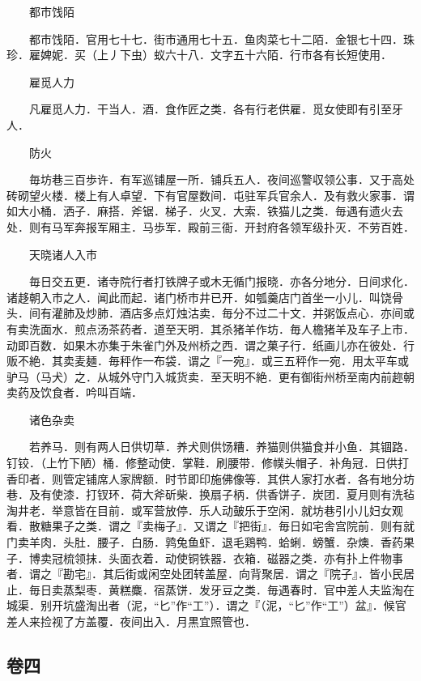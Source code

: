 　　都市饯陌

　　都市饯陌．官用七十七．街市通用七十五．鱼肉菜七十二陌．金银七十四．珠珍．雇婢妮．买（上丿下虫）蚁六十八．文字五十六陌．行市各有长短使用．

　　雇觅人力

　　凡雇觅人力．干当人．酒．食作匠之类．各有行老供雇．觅女使即有引至牙人．

　　防火

　　毎坊巷三百歩许．有军巡铺屋一所．铺兵五人．夜间巡警収领公事．又于高处砖砌望火楼．楼上有人卓望．下有官屋数间．屯驻军兵官余人．及有救火家事．谓如大小桶．洒子．麻搭．斧锯．梯子．火叉．大索．铁猫儿之类．毎遇有遗火去处．则有马军奔报军厢主．马歩军．殿前三衙．开封府各领军级扑灭．不劳百姓．

　　天晓诸人入市

　　毎日交五更．诸寺院行者打铁牌子或木无循门报晓．亦各分地分．日间求化．诸趍朝入市之人．闻此而起．诸门桥市井已开．如瓠羹店门首坐一小儿．叫饶骨头．间有灌肺及炒肺．酒店多点灯烛沽卖．毎分不过二十文．并粥饭点心．亦间或有卖洗面水．煎点汤茶药者．道至天明．其杀猪羊作坊．毎人檐猪羊及车子上市．动即百数．如果木亦集于朱雀门外及州桥之西．谓之菓子行．纸画儿亦在彼处．行贩不絶．其卖麦麺．毎秤作一布袋．谓之『一宛』．或三五秤作一宛．用太平车或驴马（马犬）之．从城外守门入城货卖．至天明不絶．更有御街州桥至南内前趂朝卖药及饮食者．吟叫百端．

　　诸色杂卖

　　若养马．则有两人日供切草．养犬则供饧糟．养猫则供猫食并小鱼．其锢路．钉铰．（上竹下陋）桶．修整动使．掌鞋．刷腰带．修幞头帽子．补角冠．日供打香印者．则管定铺席人家牌额．时节即印施佛像等．其供人家打水者．各有地分坊巷．及有使漆．打钗环．荷大斧斫柴．换扇子柄．供香饼子．炭团．夏月则有洗毡淘井老．举意皆在目前．或军营放停．乐人动皷乐于空闲．就坊巷引小儿妇女观看．散糖果子之类．谓之『卖梅子』．又谓之『把街』．毎日如宅舎宫院前．则有就门卖羊肉．头肚．腰子．白肠．鹑兔鱼虾．退毛鶏鸭．蛤蜊．螃蟹．杂燠．香药果子．博卖冠梳领抹．头面衣着．动使铜铁器．衣箱．磁器之类．亦有扑上件物事者．谓之『勘宅』．其后街或闲空处团转盖屋．向背聚居．谓之『院子』．皆小民居止．毎日卖蒸梨枣．黄糕麋．宿蒸饼．发牙豆之类．毎遇春时．官中差人夫监淘在城渠．别开坑盛淘出者（泥，``匕''作``工''）．谓之『（泥，``匕''作``工''）盆』．候官差人来捡视了方盖覆．夜间出入．月黒宜照管也．

\hypertarget{ux5377ux56db}{%
\subsection{卷四}\label{ux5377ux56db}}

